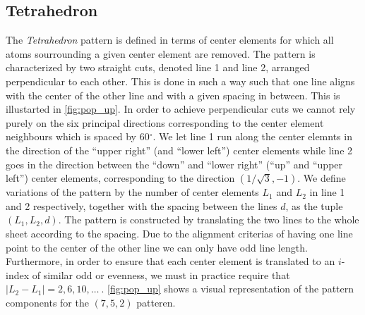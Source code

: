 \subsection{Tetrahedron}
The \textit{Tetrahedron} pattern is defined in terms of center elements for
which all atoms sourrounding a given center element are removed. The pattern is
characterized by two straight cuts, denoted line 1 and line 2, arranged
perpendicular to each other. This is done in such a way such that one line aligns with the center of the
other line and with a given spacing in between. This is illustarted in \cref{fig:pop_up}. In order to achieve
perpendicular cuts we cannot rely purely on the six principal directions
corresponding to the center element neighbours which is spaced by 60$^\circ$.
We let line 1 run along the center elemnts in the direction of the
``upper right'' (and ``lower left'') center elements  while line 2 goes in the
direction between the ``down'' and ``lower right'' (``up'' and ``upper left'') center elements, corresponding to the direction $(1/\sqrt{3}, -1)$. We define variations of the pattern by the number of center elements $L_1$ and $L_2$ in line 1 and 2 respectively, together with the spacing between the lines $d$, as the tuple $(L_1, L_2, d)$. The pattern is constructed by translating the two lines to the whole sheet according to the spacing. Due to the alignment criterias of having one line point to the center of the other line we can only have odd line length. Furthermore, in order to ensure that each center element is translated to an $i$-index of similar odd or evenness, we must in practice require that $|L_2 - L_1| = 2, 6, 10, \ldots \ $. \cref{fig:pop_up} shows a visual representation of the pattern components for the $(7, 5, 2)$ patteren. 


